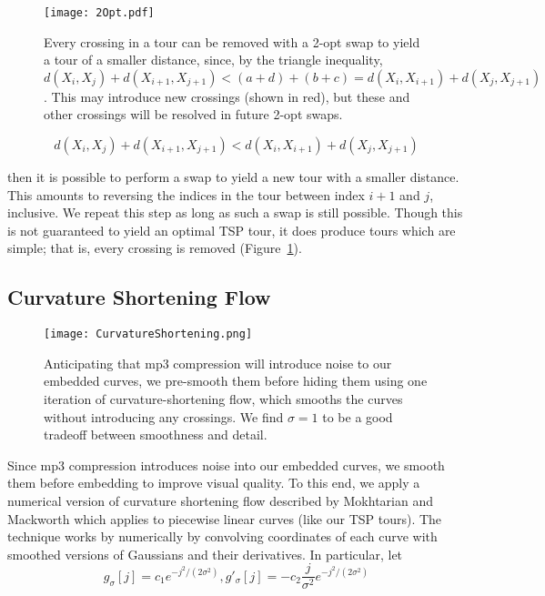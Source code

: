 \documentclass[runningheads]{llncs}
\begin{document}
\begin{figure}
  \centering
  \texttt{[image: 2Opt.pdf]}
  \caption{Every crossing in a tour can be removed with a 2-opt swap to yield a tour of a smaller distance, since, by the triangle inequality, $d(X_i, X_j) + d(X_{i+1}, X_{j+1}) < (a+d) + (b+c) = d(X_i, X_{i+1}) + d(X_j, X_{j+1})$.  This may introduce new crossings (shown in red), but these and other crossings will be resolved in future 2-opt swaps.}
  \label{fig:TwoOpt}
\end{figure}

\begin{equation}
  d(X_i, X_j) + d(X_{i+1}, X_{j+1}) < d(X_i, X_{i+1}) + d(X_j, X_{j+1})
\end{equation}

then it is possible to perform a swap to yield a new tour with a smaller distance.  This amounts to reversing the indices in the tour between index $i+1$ and $j$, inclusive.  We repeat this step as long as such a swap is still possible.  Though this is not guaranteed to yield an optimal TSP tour, it does produce tours which are simple; that is, every crossing is removed (Figure~\ref{fig:TwoOpt}).


\subsection{Curvature Shortening Flow}

\begin{figure}
  \centering
  \texttt{[image: CurvatureShortening.png]}
  \caption{Anticipating that mp3 compression will introduce noise to our embedded curves, we pre-smooth them before hiding them using one iteration of curvature-shortening flow, which smooths the curves without introducing any crossings.  We find $\sigma=1$ to be a good tradeoff between smoothness and detail.}
  \label{fig:CurvatureShortening}
\end{figure}


Since mp3 compression introduces noise into our embedded curves, we smooth them before embedding to improve visual quality.  To this end, we apply a numerical version of curvature shortening flow described by Mokhtarian and Mackworth \cite{mokhtarian1992theory} which applies to piecewise linear curves (like our TSP tours).  The technique works by numerically by convolving coordinates of each curve with smoothed versions of Gaussians and their derivatives.  In particular, let 
\begin{equation}
  g_{\sigma}[j] = c_1 e^{-j^2 / (2 \sigma^2)}, 
  g'_{\sigma}[j] = - c_2 \frac{j}{\sigma^2} e^{-j^2 / (2 \sigma^2)}
\end{equation}
\end{document}
